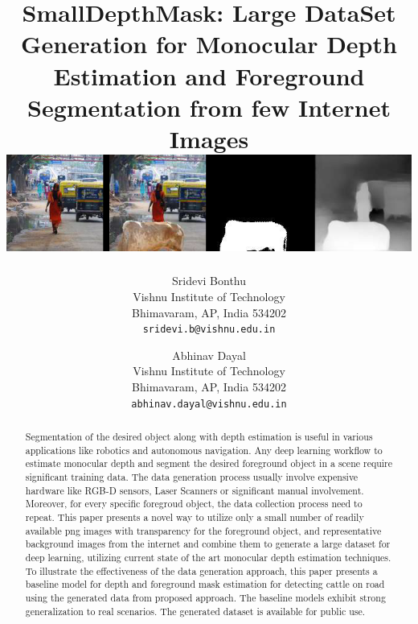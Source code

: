 \documentclass[review]{cvpr}
\begin{document}
\title{SmallDepthMask: Large DataSet Generation for Monocular Depth Estimation and Foreground Segmentation from few Internet Images
\includegraphics[width=1\textwidth]{samplerecord.png}
}

\author{Sridevi Bonthu\\
Vishnu Institute of Technology\\
Bhimavaram, AP, India 534202\\
{\tt\small sridevi.b@vishnu.edu.in}
\and
Abhinav Dayal\\
Vishnu Institute of Technology\\
Bhimavaram, AP, India 534202\\
{\tt\small abhinav.dayal@vishnu.edu.in}
}

\maketitle

\begin{abstract}
  Segmentation of the desired object along with depth estimation is useful in various applications like robotics and autonomous navigation. Any deep learning workflow to estimate monocular depth and segment the desired foreground object in a scene require significant training data. The data generation process usually involve expensive hardware like RGB-D sensors, Laser Scanners or significant manual involvement. Moreover, for every specific foregroud object, the data collection process need to repeat. This paper presents a novel way to utilize only a small number of readily available png images with transparency for the foreground object, and representative background images from the internet and combine them to generate a large dataset for deep learning, utilizing current state of the art monocular depth estimation techniques. To illustrate the effectiveness of the data generation approach, this paper presents a baseline model for depth and foreground mask estimation for detecting cattle on road using the generated data from proposed approach. The baseline models exhibit strong generalization to real scenarios. The generated dataset is available for public use.
\end{abstract}
\end{document}
